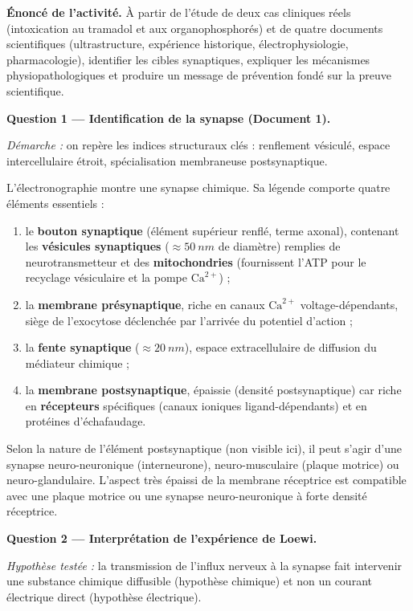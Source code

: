 \documentclass[11pt]{article}
\newcommand{\cle}[1]{{\popxbold\color{popdark}#1}}
\begin{document}
\begin{exoresolu}
\textbf{Énoncé de l'activité.} À partir de l'étude de deux cas cliniques réels (intoxication au tramadol et aux organophosphorés) et de quatre documents scientifiques (ultrastructure, expérience historique, électrophysiologie, pharmacologie), identifier les cibles synaptiques, expliquer les mécanismes physiopathologiques et produire un message de prévention fondé sur la preuve scientifique.
\tcblower

\textbf{Question 1 — Identification de la synapse (Document 1).}

\emph{Démarche :} on repère les indices structuraux clés : renflement vésiculé, espace intercellulaire étroit, spécialisation membraneuse postsynaptique.

L'électronographie montre une \cle{synapse chimique}. Sa légende comporte quatre éléments essentiels :
\begin{enumerate}
\item le \textbf{bouton synaptique} (élément supérieur renflé, terme axonal), contenant les \textbf{vésicules synaptiques} ($\approx \SI{50}{nm}$ de diamètre) remplies de neurotransmetteur et des \textbf{mitochondries} (fournissent l'ATP pour le recyclage vésiculaire et la pompe $\text{Ca}^{2+}$) ;
\item la \textbf{membrane présynaptique}, riche en canaux $\text{Ca}^{2+}$ voltage-dépendants, siège de l'exocytose déclenchée par l'arrivée du potentiel d'action ;
\item la \textbf{fente synaptique} ($\approx \SI{20}{nm}$), espace extracellulaire de diffusion du médiateur chimique ;
\item la \textbf{membrane postsynaptique}, épaissie (densité postsynaptique) car riche en \textbf{récepteurs} spécifiques (canaux ioniques ligand-dépendants) et en protéines d'échafaudage.
\end{enumerate}
Selon la nature de l'élément postsynaptique (non visible ici), il peut s'agir d'une synapse neuro-neuronique (interneurone), neuro-musculaire (plaque motrice) ou neuro-glandulaire. L'aspect très épaissi de la membrane réceptrice est compatible avec une plaque motrice ou une synapse neuro-neuronique à forte densité réceptrice.

\medskip

\textbf{Question 2 — Interprétation de l'expérience de Loewi.}

\emph{Hypothèse testée :} la transmission de l'influx nerveux à la synapse fait intervenir une substance chimique diffusible (hypothèse chimique) et non un courant électrique direct (hypothèse électrique).


\end{exoresolu}
\end{document}
